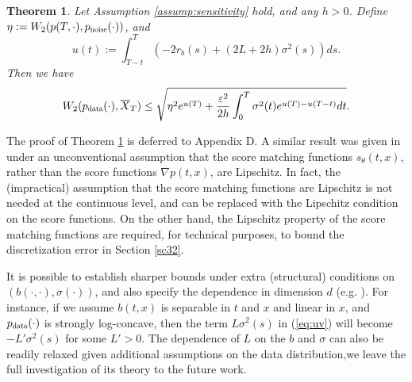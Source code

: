 \documentclass[letterpaper,10pt,reqno]{amsart}
\def\eqref#1{(\ref{#1})}
\newtheorem{theorem}{Theorem}
\numberwithin{equation}{section}
\begin{document}
\begin{theorem}
\label{thm:sensitivity}
Let Assumption \ref{assump:sensitivity} hold, and any $h > 0$.
Define $\eta:=W_2(p(T, \cdot), p_{\scalebox{0.7}{noise}}(\cdot))$,
and
\begin{equation}
\label{eq:uv}
u(t):=\int_{T-t}^T \left(-2 r_b(s) + (2L + 2h) \sigma^2(s) \right)ds.
\end{equation}
Then we have 
\begin{equation}
\label{eq:sensitivity}
W_2(p_{\scalebox{0.7}{data}}(\cdot), \overline{X}_T) \le \sqrt{\eta^2 e^{u(T)} + \frac{\varepsilon^2}{2h} \int_0^T \sigma^2(t) e^{u(T)-u(T-t)} dt}.
\end{equation}
\end{theorem}

\quad The proof of Theorem \ref{thm:sensitivity} is deferred to Appendix D.
A similar result was given in \cite{KW22} 
under an unconventional assumption that
the score matching functions $s_\theta(t,x)$,
rather than the score functions $\nabla p(t,x)$,
are Lipschitz.
In fact,
the (impractical) assumption that 
the score matching functions are Lipschitz
is not needed at the continuous level,
and can be replaced with the Lipschitz condition on the score functions.
On the other hand,
the Lipschitz property of the score matching functions
are required, for technical purposes,
to bound the discretization error in Section \ref{sc32}.

\quad It is possible to establish sharper bounds under extra (structural) conditions on $(b(\cdot, \cdot), \sigma(\cdot))$, 
and also specify the dependence in dimension $d$ (e.g. \cite{Chen23, GNZ23}).
For instance, if we assume $b(t,x)$ is separable in $t$ and $x$ and linear in $x$,
and $p_{\scalebox{0.7}{data}}(\cdot)$ is strongly log-concave,
then the term $L \sigma^2(s)$ in \eqref{eq:uv} will become $-L' \sigma^2(s)$ for some $L' > 0$. The dependence of $L$ on the $b$ and $\sigma$ can also be readily relaxed given additional assumptions on the data distribution,we leave the full investigation of its theory to the future work.
\end{document}
